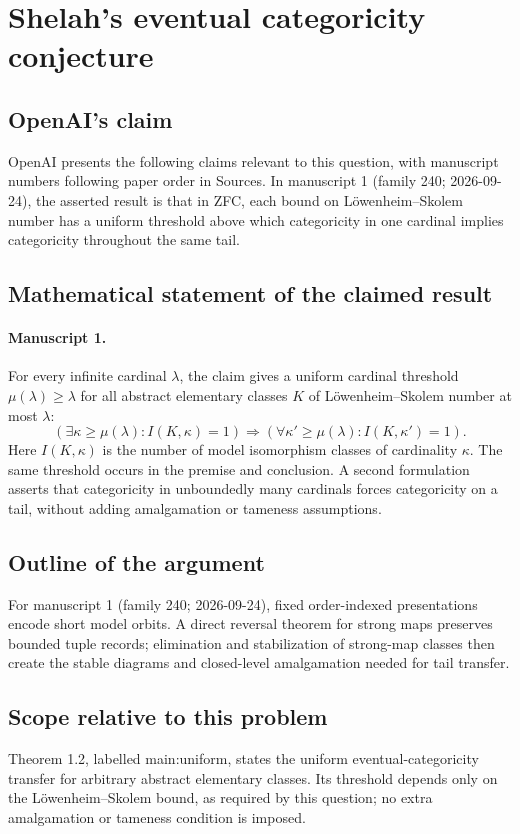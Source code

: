 \documentclass[11pt]{article}
\begin{document}
\section*{Shelah's eventual categoricity conjecture}

\subsection{OpenAI's claim}
OpenAI presents the following claims relevant to this question, with manuscript numbers following paper order in Sources. In manuscript 1 (family 240; 2026-09-24), the asserted result is that in ZFC, each bound on L\"owenheim--Skolem number has a uniform threshold above which categoricity in one cardinal implies categoricity throughout the same tail.

\subsection{Mathematical statement of the claimed result}
\paragraph{Manuscript 1.}
For every infinite cardinal $\lambda$, the claim gives a uniform cardinal threshold $\mu(\lambda)\ge\lambda$ for all abstract elementary classes $K$ of L\"owenheim--Skolem number at most $\lambda$:
\[
 (\exists\kappa\ge\mu(\lambda):I(K,\kappa)=1)
 \Longrightarrow(\forall\kappa'\ge\mu(\lambda):I(K,\kappa')=1).
\]
Here $I(K,\kappa)$ is the number of model isomorphism classes of cardinality $\kappa$. The same threshold occurs in the premise and conclusion. A second formulation asserts that categoricity in unboundedly many cardinals forces categoricity on a tail, without adding amalgamation or tameness assumptions.

\subsection{Outline of the argument}
For manuscript 1 (family 240; 2026-09-24), fixed order-indexed presentations encode short model orbits. A direct reversal theorem for strong maps preserves bounded tuple records; elimination and stabilization of strong-map classes then create the stable diagrams and closed-level amalgamation needed for tail transfer.

\subsection{Scope relative to this problem}
Theorem 1.2, labelled main:uniform, states the uniform eventual-categoricity transfer for arbitrary abstract elementary classes. Its threshold depends only on the L\"owenheim--Skolem bound, as required by this question; no extra amalgamation or tameness condition is imposed.
\end{document}

